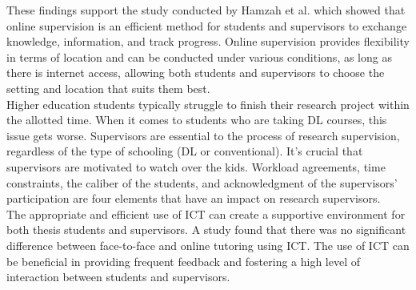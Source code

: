 These findings support the study conducted by Hamzah et al. which showed that online supervision is an efficient method for students and supervisors to exchange knowledge, information, and track progress. Online supervision provides flexibility in terms of location and can be conducted under various conditions, as long as there is internet access, allowing both students and supervisors to choose the setting and location that suits them best.\cite{hamzah2017web}\\

Higher education students typically struggle to finish their research project within the allotted time.\cite{costa2018systematic} When it comes to students who are taking DL courses, this issue gets worse. Supervisors are essential to the process of research supervision, regardless of the type of schooling (DL or conventional). It's crucial that supervisors are motivated to watch over the kids. Workload agreements, time constraints, the caliber of the students, and acknowledgment of the supervisors' participation are four elements that have an impact on research supervisors.\cite{askew2016facilitators}\\


The appropriate and efficient use of ICT can create a supportive environment for both thesis students and supervisors. A study found that there was no significant difference between face-to-face and online tutoring using ICT. The use of ICT can be beneficial in providing frequent feedback and fostering a high level of interaction between students and supervisors.\cite{iwasaki2019design} \cite{hansen2015optimizing}\\


